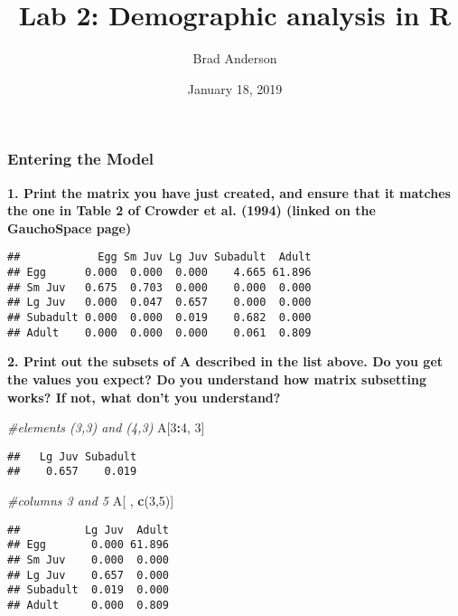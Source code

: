 \documentclass[]{article}
\title{Lab 2: Demographic analysis in R}
\author{Brad Anderson}
\date{January 18, 2019}
\newenvironment{Shaded}{\begin{snugshade}}{\end{snugshade}}
\newcommand{\KeywordTok}[1]{\textcolor[rgb]{0.13,0.29,0.53}{\textbf{#1}}}
\newcommand{\DecValTok}[1]{\textcolor[rgb]{0.00,0.00,0.81}{#1}}
\newcommand{\CommentTok}[1]{\textcolor[rgb]{0.56,0.35,0.01}{\textit{#1}}}
\newcommand{\OperatorTok}[1]{\textcolor[rgb]{0.81,0.36,0.00}{\textbf{#1}}}
\newcommand{\NormalTok}[1]{#1}
\begin{document}
\maketitle

\subsubsection{Entering the Model}\label{entering-the-model}

\textbf{1. Print the matrix you have just created, and ensure that it
matches the one in Table 2 of Crowder et al. (1994) (linked on the
GauchoSpace page)}

\begin{verbatim}
##            Egg Sm Juv Lg Juv Subadult  Adult
## Egg      0.000  0.000  0.000    4.665 61.896
## Sm Juv   0.675  0.703  0.000    0.000  0.000
## Lg Juv   0.000  0.047  0.657    0.000  0.000
## Subadult 0.000  0.000  0.019    0.682  0.000
## Adult    0.000  0.000  0.000    0.061  0.809
\end{verbatim}

\textbf{2. Print out the subsets of A described in the list above. Do
you get the values you expect? Do you understand how matrix subsetting
works? If not, what don't you understand? }

\begin{Shaded}
\begin{Highlighting}[]
\CommentTok{#elements (3,3) and (4,3)}
\NormalTok{A[}\DecValTok{3}\OperatorTok{:}\DecValTok{4}\NormalTok{, }\DecValTok{3}\NormalTok{]}
\end{Highlighting}
\end{Shaded}

\begin{verbatim}
##   Lg Juv Subadult 
##    0.657    0.019
\end{verbatim}

\begin{Shaded}
\begin{Highlighting}[]
\CommentTok{#columns 3 and 5}
\NormalTok{A[ , }\KeywordTok{c}\NormalTok{(}\DecValTok{3}\NormalTok{,}\DecValTok{5}\NormalTok{)]}
\end{Highlighting}
\end{Shaded}

\begin{verbatim}
##          Lg Juv  Adult
## Egg       0.000 61.896
## Sm Juv    0.000  0.000
## Lg Juv    0.657  0.000
## Subadult  0.019  0.000
## Adult     0.000  0.809
\end{verbatim}
\end{document}
